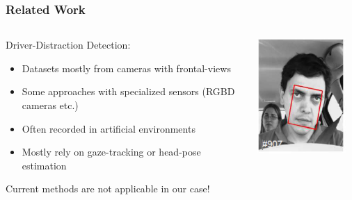 \documentclass{beamer}
\begin{document}
	\begin{frame}
		\frametitle{Related Work}
		
		\begin{columns}
			\begin{column}{0.75\textwidth}
				Driver-Distraction Detection:
				\begin{itemize}
					\item Datasets mostly from cameras with frontal-views \cite{itsc:bergasa2008}
					\item Some approaches with specialized sensors (RGBD cameras etc.) \cite{Ragab2014}
					\item Often recorded in artificial environments \cite{Ragab2014}
					\item Mostly rely on gaze-tracking or head-pose estimation \cite{Dorazio} \cite{6957817}
				\end{itemize}		
				Current methods are not applicable in our case!
			\end{column}
			\begin{column}{0.25\textwidth}  %
				\begin{center}
					\includegraphics[width=0.9\textwidth]{frontal-view-dataset} \\

\end{center}
\end{column}
\end{columns}
\end{frame}
\end{document}
